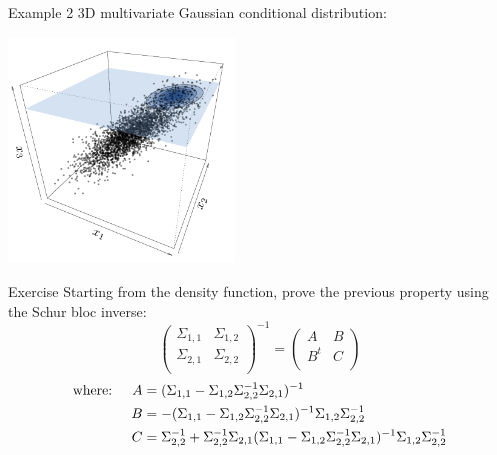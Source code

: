 \begin{frame}{}
\begin{exampleblock}{Example 2}
3D multivariate Gaussian conditional distribution:\\
\begin{center}
\includegraphics[height=6cm]{1_stat_models/figures/ch1_condpdf2}
\end{center}
\end{exampleblock}
\end{frame}


\begin{frame}{}
\begin{exampleblock}{Exercise}
	Starting from the density function, prove the previous property using the Schur bloc inverse:
\begin{equation*}
\begin{pmatrix}
	\Sigma_{1,1} & \Sigma_{1,2}\\
	\Sigma_{2,1} & \Sigma_{2,2}\\
\end{pmatrix}^{-1} =
\begin{pmatrix}
	A & B\\
	B^t & C\\
\end{pmatrix}
\end{equation*}
\begin{equation*}
\begin{split}
 \text{where: \quad} A &= (\Sigma_{1,1} - \Sigma_{1,2} \Sigma_{2,2}^{-1} \Sigma_{2,1})^{-1}\\
 B &= -(\Sigma_{1,1} - \Sigma_{1,2} \Sigma_{2,2}^{-1} \Sigma_{2,1})^{-1}\Sigma_{1,2}\Sigma_{2,2}^{-1}\\
 C &= \Sigma_{2,2}^{-1} + \Sigma_{2,2}^{-1} \Sigma_{2,1} (\Sigma_{1,1} -\Sigma_{1,2} \Sigma_{2,2}^{-1} \Sigma_{2,1})^{-1}\Sigma_{1,2}\Sigma_{2,2}^{-1}
\end{split}
\end{equation*}
\end{exampleblock}
\end{frame}

